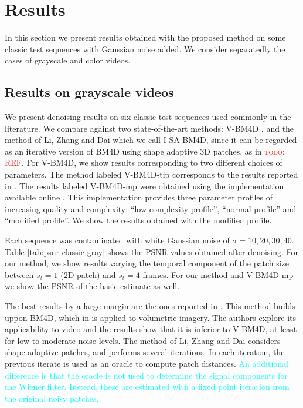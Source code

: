 \documentclass[10pt, journal, twocolumn, final, a4paper]{IEEEtran}
\newcommand{\pa}[1]{\textcolor{cyan}{#1}}
\newcommand{\padd}[1]{\pa{#1}}
\newcommand{\todo}[1]{\textcolor{red}{\noindent\textsc{todo}: #1}}
\begin{document}
\section{Results}
\label{sec:results}

In this section we present results obtained with the proposed
method on some classic test sequences with Gaussian noise added.
We consider separatedly the cases of grayscale and color videos.

\subsection{Results on grayscale videos}

We present denoising results on six classic test sequences used commonly in the
literature. We compare against two state-of-the-art methods: V-BM4D
\cite{Maggioni2012}, and the method of Li, Zhang and Dai \cite{LiZhangDai2011}
which we call I-SA-BM4D, since it can be regarded as an iterative version of BM4D \cite{Maggioni2013}
using shape adaptive 3D patches, as in \todo{REF}.  
For V-BM4D, we show results corresponding to two
different choices of parameters. The method labeled V-BM4D-tip
corresponds to the results reported
in \cite{Maggioni2012}. The results labeled V-BM4D-mp were
obtained using the implementation available online \cite{bm4dcode}. This
implementation provides three parameter profiles of increasing quality and
complexity: ``low complexity profile'', ``normal profile'' and ``modified
profile''. We show the results obtained with the modified profile.

Each sequence was contaminated with white Gaussian noise of $\sigma =
10,20,30,40$. Table \ref{tab:psnr-classic-gray} shows the
PSNR values obtained after denoising. For our method, we show results varying the temporal
component of the patch size between $s_t = 1$ (2D patch) and $s_t = 4$ frames.
For our method and V-BM4D-mp we show the PSNR of the basic estimate as well.

The best results by a large margin are the ones reported in
\cite{LiZhangDai2011}. This method builds uppon BM4D, which in \cite{Maggioni2013}
is applied to volumetric imagery. The authors explore its applicability to video 
and the results show that it is inferior to V-BM4D, at least 
for low to moderate noise levels. The method of Li, Zhang and Dai \cite{LiZhangDai2011} 
considers shape adaptive patches, and performs several iterations. In each iteration,
the previous iterate is used as an oracle to compute patch distances.
\padd{An additional difference is that the oracle is not used to determine the
signal components for the Wiener filter. Instead, these are estimated with a fixed
point iteration from the original noisy patches.}
\end{document}
